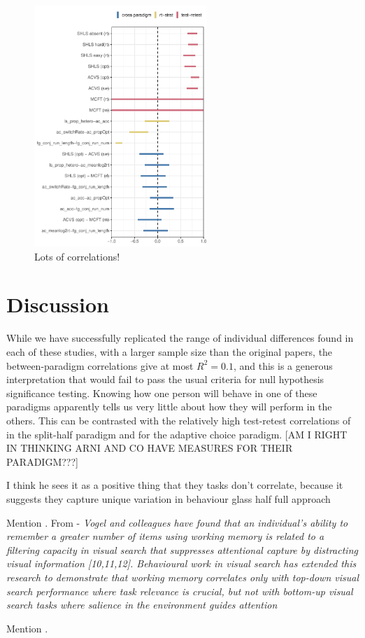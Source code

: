 \documentclass[]{rsos}%
\begin{document}
\begin{figure}
\centering
\includegraphics[width=6.5cm]{../Scripts/scratch/cor_comparison.pdf}
\caption{Lots of correlations!}
\label{fig:all_the_cor}
\end{figure}


\section{Discussion}

While we have successfully replicated the range of individual differences found in each of these studies, with a larger sample size than the original papers, the between-paradigm correlations give at most $R^2 = 0.1$, and this is a generous interpretation that would fail to pass the usual criteria for null hypothesis significance testing. Knowing how one person will behave in one of these paradigms apparently tells us very little about how they will perform in the others. This can be contrasted with the relatively high test-retest correlations of  in the split-half paradigm and  for the adaptive choice paradigm\cite{irons-leber2018}. [AM I RIGHT IN THINKING ARNI AND CO HAVE MEASURES FOR THEIR PARADIGM???]



I think he sees it as a positive thing that they tasks don't correlate, because it suggests they capture unique variation in behaviour glass half full approach 

Mention \cite{vogel2008}.
From \cite{proulx2011} - \textit{Vogel and colleagues have found that an individual's ability to remember a greater number of items using working memory is related to a filtering capacity in visual search that suppresses attentional capture by distracting visual information [10,11,12]. Behavioural work in visual search has extended this research to
demonstrate that working memory correlates only with top-down
visual search performance where task relevance is crucial, but not
with  bottom-up  visual  search  tasks  where  salience  in  the
environment guides attention \cite{sobel2007}}


Mention \cite{stoet2011}.




\end{document}
